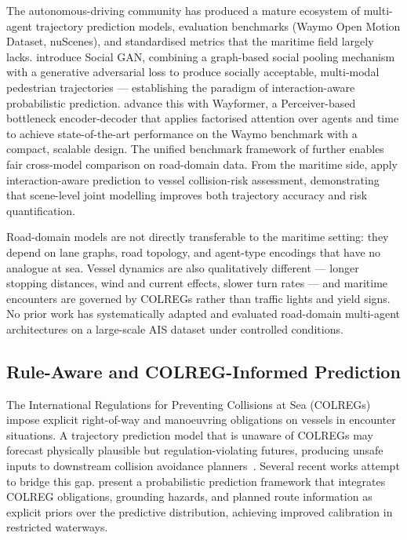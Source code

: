 \documentclass[12pt, a4paper]{article}
\begin{document}
  The autonomous-driving community has produced a mature ecosystem of
  multi-agent trajectory prediction models, evaluation benchmarks (Waymo Open
  Motion Dataset, nuScenes), and standardised metrics that the maritime field
  largely lacks.  \citet{gupta2018socialgan} introduce Social GAN, combining a
  graph-based social pooling mechanism with a generative adversarial loss to
  produce socially acceptable, multi-modal pedestrian trajectories --- establishing
  the paradigm of interaction-aware probabilistic prediction.
  \citet{nayakanti2022wayformer} advance this with Wayformer, a Perceiver-based
  bottleneck encoder-decoder that applies factorised attention over agents and
  time to achieve state-of-the-art performance on the Waymo benchmark with a
  compact, scalable design.  The unified benchmark framework of
  \citet{feng2024unitraj} further enables fair cross-model comparison on
  road-domain data.  From the maritime side, \citet{alam2025multivessel} apply
  interaction-aware prediction to vessel collision-risk assessment, demonstrating
  that scene-level joint modelling improves both trajectory accuracy and risk
  quantification.

  Road-domain models are not directly transferable to the maritime setting:
  they depend on lane graphs, road topology, and agent-type encodings that have
  no analogue at sea.  Vessel dynamics are also qualitatively different ---
  longer stopping distances, wind and current effects, slower turn rates ---
  and maritime encounters are governed by COLREGs rather than traffic lights and
  yield signs.  No prior work has systematically adapted and evaluated
  road-domain multi-agent architectures on a large-scale AIS dataset under
  controlled conditions.

  \subsection{Rule-Aware and COLREG-Informed Prediction}

  The International Regulations for Preventing Collisions at Sea
  (COLREGs)~\citep{colregs1972} impose explicit right-of-way and manoeuvring
  obligations on vessels in encounter situations.  A trajectory prediction model
  that is unaware of COLREGs may forecast physically plausible but
  regulation-violating futures, producing unsafe inputs to downstream collision
  avoidance planners~\citep{kuwata2014safe, vagale2021path}.  Several recent works
  attempt to bridge this gap.  \citet{mahipala2025colreg} present a probabilistic
  prediction framework that integrates COLREG obligations, grounding hazards, and
  planned route information as explicit priors over the predictive distribution,
  achieving improved calibration in restricted waterways.
\end{document}
